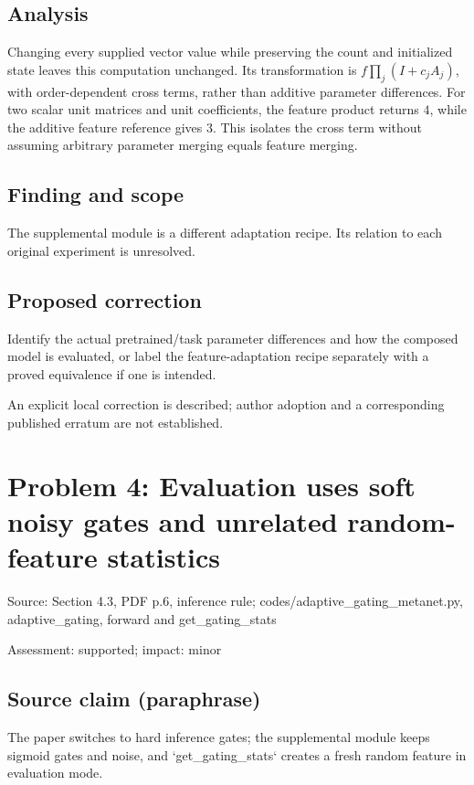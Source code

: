 \documentclass[11pt]{article}
\begin{document}
\subsection*{Analysis}

Changing every supplied vector value while preserving the count and initialized state leaves this computation unchanged. Its transformation is \(f\prod_j(I+c_jA_j)\), with order-dependent cross terms, rather than additive parameter differences. For two scalar unit matrices and unit coefficients, the feature product returns \(4\), while the additive feature reference gives \(3\). This isolates the cross term without assuming arbitrary parameter merging equals feature merging.

\subsection*{Finding and scope}

The supplemental module is a different adaptation recipe. Its relation to each original experiment is unresolved.

\subsection*{Proposed correction}

Identify the actual pretrained/task parameter differences and how the composed model is evaluated, or label the feature-adaptation recipe separately with a proved equivalence if one is intended.

An explicit local correction is described; author adoption and a corresponding published erratum are not established.

\section*{Problem 4: Evaluation uses soft noisy gates and unrelated random-feature statistics}

Source: Section 4.3, PDF p.6, inference rule; codes/adaptive\_gating\_metanet.py, adaptive\_gating, forward and get\_gating\_stats

Assessment: supported; impact: minor

\subsection*{Source claim (paraphrase)}

The paper switches to hard inference gates; the supplemental module keeps sigmoid gates and noise, and `get\_gating\_stats` creates a fresh random feature in evaluation mode.
\end{document}
